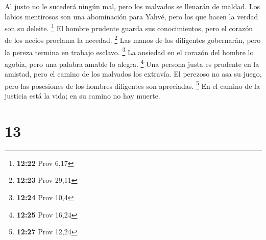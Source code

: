  Al justo no le sucederá ningún mal, pero los malvados se
llenarán de maldad.  Los labios mentirosos son una
abominación para Yahvé, pero los que hacen la verdad son su deleite.
\footnote{\textbf{12:22} Prov 6,17}  El hombre prudente
guarda sus conocimientos, pero el corazón de los necios proclama la
necedad. \footnote{\textbf{12:23} Prov 29,11}  Las manos
de los diligentes gobernarán, pero la pereza termina en trabajo esclavo.
\footnote{\textbf{12:24} Prov 10,4}  La ansiedad en el
corazón del hombre lo agobia, pero una palabra amable lo alegra.
\footnote{\textbf{12:25} Prov 16,24}  Una persona justa
es prudente en la amistad, pero el camino de los malvados los extravía.
 El perezoso no asa su juego, pero las posesiones de los
hombres diligentes son apreciadas. \footnote{\textbf{12:27} Prov 12,24}
 En el camino de la justicia está la vida; en su camino
no hay muerte.

\hypertarget{section-12}{%
\section{13}\label{section-12}}

